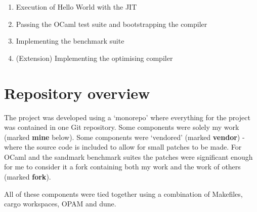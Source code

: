 \begin{enumerate}
      \item Execution of Hello World with the JIT
      \item Passing the OCaml test suite and bootstrapping the compiler
      \item Implementing the benchmark suite
      \item (Extension) Implementing the optimising compiler
\end{enumerate}

\section{Repository overview}

The project was developed using a `monorepo' where everything for the project was contained in one
Git repository. Some components were solely my work (marked \textbf{mine} below). Some components
were `vendored' (marked \textbf{vendor}) - where the source code is included to allow for small
patches to be made. For OCaml and the sandmark benchmark suites the patches were significant enough
for me to consider it a fork containing both my work and the work of others (marked \textbf{fork}).


All of these components were tied together using a combination of Makefiles, cargo workspaces, OPAM
and dune.

